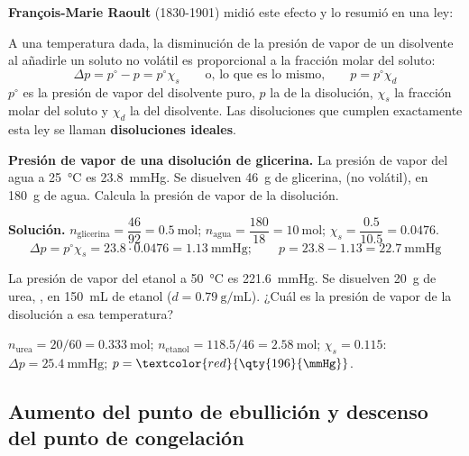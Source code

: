 \textbf{François-Marie Raoult} (1830-1901) midió este efecto y lo resumió en una ley:

\begin{definition}
    A una temperatura dada, la disminución de la presión de vapor de un disolvente al añadirle un soluto no volátil es
    proporcional a la fracción molar del soluto:
    \[ \Delta p = p^{\circ} - p = p^{\circ} \chi_s \qquad \text{o, lo que es lo mismo,} \qquad p = p^{\circ} \chi_d \]
    \(p^{\circ}\) es la presión de vapor del disolvente puro, \(p\) la de la disolución, \(\chi_s\) la fracción molar del soluto y
    \(\chi_d\) la del disolvente. Las disoluciones que cumplen exactamente esta ley se llaman \textbf{disoluciones ideales}.
\end{definition}

\begin{example}
    \textbf{Presión de vapor de una disolución de glicerina.} La presión de vapor del agua a \qty{25}{\degreeCelsius} es
    \qty{23.8}{\mmHg}. Se disuelven \qty{46}{\gram} de glicerina,  (no volátil), en \qty{180}{\gram} de agua.
    Calcula la presión de vapor de la disolución.

    \textbf{Solución.} \(n_{\text{glicerina}} = \dfrac{46}{92} = \qty{0.5}{\mol}\); \(n_{\text{agua}} = \dfrac{180}{18} = \qty{10}{\mol}\);
    \(\chi_s = \dfrac{\num{0.5}}{\num{10.5}} = \num{0.0476}\).
    \[ \Delta p = p^{\circ} \chi_s = \num{23.8} \cdot \num{0.0476} = \qty{1.13}{\mmHg}; \qquad p = \num{23.8} - \num{1.13} = \qty{22.7}{\mmHg} \]
\end{example}

\begin{exercise}
    La presión de vapor del etanol a \qty{50}{\degreeCelsius} es \qty{221.6}{\mmHg}. Se disuelven \qty{20}{\gram} de urea,
    , en \qty{150}{\mL} de etanol (\(d = \qty{0.79}{\gram\per\mL}\)). ¿Cuál es la presión de vapor de la
    disolución a esa temperatura?
    \begin{solu}
        \(n_{\text{urea}} = 20/60 = \qty{0.333}{\mol}\); \(n_{\text{etanol}} = \num{118.5}/46 = \qty{2.58}{\mol}\);
        \(\chi_s = \num{0.115}\): \(\Delta p = \qty{25.4}{\mmHg}\); \(p = \textcolor{red}{\qty{196}{\mmHg}}\).
    \end{solu}
\end{exercise}

\subsection{Aumento del punto de ebullición y descenso del punto de congelación}

